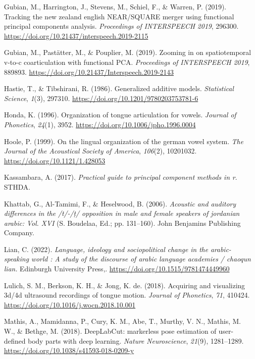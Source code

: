 \documentclass[
  man,
  longtable,
  nolmodern,
  notxfonts,
  notimes,
  colorlinks=true,linkcolor=blue,citecolor=blue,urlcolor=blue]{apa7}
\newlength{\cslhangindent}
\newenvironment{CSLReferences}[2] %
 {\begin{list}{}{%
  \setlength{\itemindent}{0pt}
  \setlength{\leftmargin}{0pt}
  \setlength{\parsep}{0pt}
  \ifodd #1
   \setlength{\leftmargin}{\cslhangindent}
   \setlength{\itemindent}{-1\cslhangindent}
  \fi
  \setlength{\itemsep}{#2\baselineskip}}}
 {\end{list}}
\begin{document}
\begin{CSLReferences}{1}{0}
Gubian, M., Harrington, J., Stevens, M., Schiel, F., \& Warren, P.
(2019). Tracking the new zealand english NEAR/SQUARE merger using
functional principal components analysis. \emph{Proceedings of
INTERSPEECH 2019}, 296300.
\url{https://doi.org/10.21437/interspeech.2019-2115}

Gubian, M., Pastätter, M., \& Pouplier, M. (2019). Zooming in on
spatiotemporal v-to-c coarticulation with functional PCA.
\emph{Proceedings of INTERSPEECH 2019}, 889893.
\url{https://doi.org/10.21437/Interspeech.2019-2143}

Hastie, T., \& Tibshirani, R. (1986). Generalized additive models.
\emph{Statistical Science}, \emph{1}(3), 297310.
\url{https://doi.org/10.1201/9780203753781-6}

Honda, K. (1996). Organization of tongue articulation for vowels.
\emph{Journal of Phonetics}, \emph{24}(1), 3952.
\url{https://doi.org/10.1006/jpho.1996.0004}

Hoole, P. (1999). On the lingual organization of the german vowel
system. \emph{The Journal of the Acoustical Society of America},
\emph{106}(2), 10201032. \url{https://doi.org/10.1121/1.428053}

Kassambara, A. (2017). \emph{Practical guide to principal component
methods in r}. STHDA.

Khattab, G., Al-Tamimi, F., \& Heselwood, B. (2006). \emph{Acoustic and
auditory differences in the /t/-/ṭ/ opposition in male and female
speakers of jordanian arabic: Vol. XVI} (S. Boudelaa, Ed.; pp.
131--160). John Benjamins Publishing Company.

Lian, C. (2022). \emph{Language, ideology and sociopolitical change in
the arabic-speaking world : A study of the discourse of arabic language
academies / chaoqun lian.} Edinburgh University Press,.
\url{https://doi.org/10.1515/9781474449960}

Lulich, S. M., Berkson, K. H., \& Jong, K. de. (2018). Acquiring and
visualizing 3d/4d ultrasound recordings of tongue motion. \emph{Journal
of Phonetics}, \emph{71}, 410424.
\url{https://doi.org/10.1016/j.wocn.2018.10.001}

Mathis, A., Mamidanna, P., Cury, K. M., Abe, T., Murthy, V. N., Mathis,
M. W., \& Bethge, M. (2018). DeepLabCut: markerless pose estimation of
user-defined body parts with deep learning. \emph{Nature Neuroscience},
\emph{21}(9), 1281--1289.
\url{https://doi.org/10.1038/s41593-018-0209-y}


\end{CSLReferences}
\end{document}
